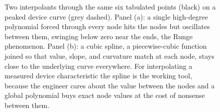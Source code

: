 \begin{figure}[htbp]
{%
}%
\caption[Spline against global polynomial for interpolating a device
curve]{Two interpolants through the same six tabulated points (black)
on a peaked device curve (grey dashed). Panel (a): a single
high-degree polynomial forced through every node hits the nodes but
oscillates between them, swinging below zero near the ends, the Runge
phenomenon. Panel (b): a cubic spline, a piecewise-cubic function
joined so that value, slope, and curvature match at each node, stays
close to the underlying curve everywhere. For interpolating a measured
device characteristic the spline is the working tool, because the
engineer cares about the value between the nodes and a global
polynomial buys exact node values at the cost of nonsense between
them.}
\label{fig:vol02:ch02:spline-vs-polynomial}
\end{figure}
